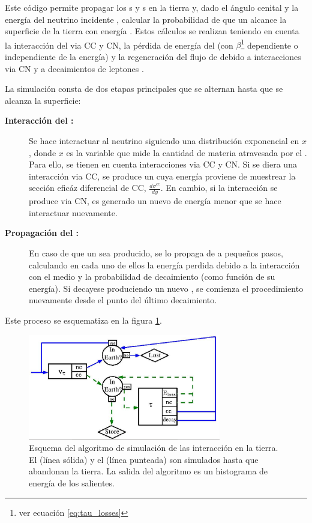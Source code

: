 		Este c\'odigo permite propagar los \nutau{}s y \tauon{}s en la tierra y, dado el \'angulo cenital \tita{} y la energ\'ia del neutrino incidente \enu{}, calcular la probabilidad de que un \tauon{} alcance la superficie de la tierra con energ\'ia \etau{}.
		Estos c\'alculos se realizan teniendo en cuenta la interacci\'on del \nutau{} via CC y CN, la p\'erdida de energ\'ia del \tauon{} (con $\beta$\footnote{ver ecuaci\'on \ref{eq:tau_losses}} dependiente o independiente de la energ\'ia) y la regeneraci\'on del flujo de \nutau{} debido a interacciones via CN y a decaimientos de leptones \tauon{}.
		
		La simulaci\'on consta de dos etapas principales que se alternan hasta que se alcanza la superficie:
		\begin{description}
		\item[\textbf{Interacci\'on del \nutau{}:}] Se hace interactuar al neutrino siguiendo una distribuci\'on exponencial en $x$, donde $x$ es la variable que mide la cantidad de materia atravesada por el \nutau{}. Para ello, se tienen en cuenta interacciones via CC y CN. Si se diera una interacci\'on via CC, se produce un \tauon{} cuya energ\'ia proviene de muestrear la sección efic\'az diferencial de CC, $\frac{d\sigma^{cc}}{dy}$. En cambio, si la interacci\'on se produce via CN, es generado un nuevo \nutau{} de energ\'ia menor que se hace interactuar nuevamente.
		\item[\textbf{Propagaci\'on del \tauon{}:}] En caso de que un \tauon{} sea producido, se lo propaga de a peque\~nos pasos, calculando en cada uno de ellos la energ\'ia perdida debido a la interacci\'on con el medio y la probabilidad de decaimiento (como funci\'on de su energ\'ia). Si decayese produciendo un nuevo \nutau{}, se comienza el procedimiento nuevamente desde el punto del \'ultimo decaimiento.
		\end{description}
		Este proceso se esquematiza en la figura \ref{fig:tau_sim_sch}.
		\begin{figure}[ht!]
			\begin{center}
			\includegraphics[width=0.75\textwidth]{fig/simulacionAuger/schemeEarthProp}
			\caption{\label{fig:tau_sim_sch} Esquema del algoritmo de simulación de las interacción en la tierra. El \nutau{} (línea sólida) y el \tauon{} (línea punteada) son simulados hasta que abandonan la tierra. La salida del algoritmo es un histograma de energía de los \tauon{} salientes.}
			\end{center}
		\end{figure}
		
